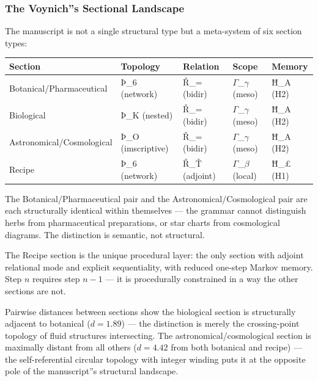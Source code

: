 \documentclass[12pt,a4paper]{article}
\begin{document}
\subsubsection{The Voynich''s Sectional Landscape}

The manuscript is not a single structural type but a meta-system of six section types:

\begin{table}[htbp]
\centering
\small
{}
\begin{tabularx}{\textwidth}{>{\centering\arraybackslash}X >{\centering\arraybackslash}X >{\centering\arraybackslash}X >{\centering\arraybackslash}X >{\centering\arraybackslash}X}
\toprule
\rowcolor{gray!25}\textbf{Section} & \textbf{Topology} & \textbf{Relation} & \textbf{Scope} & \textbf{Memory} \\
\midrule
\rowcolors{1}{white}{gray!10}
Botanical/Pharmaceutical & Þ\_6 (network) & Ř\_= (bidir) & $\Gamma$\_$\gamma$ (meso) & Ħ\_A (H2) \\
Biological & Þ\_K (nested) & Ř\_= (bidir) & $\Gamma$\_$\gamma$ (meso) & Ħ\_A (H2) \\
Astronomical/Cosmological & Þ\_O (imscriptive) & Ř\_= (bidir) & $\Gamma$\_$\gamma$ (meso) & Ħ\_A (H2) \\
Recipe & Þ\_6 (network) & Ř\_Ť (adjoint) & $\Gamma$\_$\beta$ (local) & Ħ\_£ (H1) \\
\bottomrule
\end{tabularx}
\end{table}

The Botanical/Pharmaceutical pair and the Astronomical/Cosmological pair are each structurally identical within themselves --- the grammar cannot distinguish herbs from pharmaceutical preparations, or star charts from cosmological diagrams. The distinction is semantic, not structural.

The Recipe section is the unique procedural layer: the only section with adjoint relational mode and explicit sequentiality, with reduced one-step Markov memory. Step $n$ requires step $n-1$ --- it is procedurally constrained in a way the other sections are not.

Pairwise distances between sections show the biological section is structurally adjacent to botanical ($d = 1.89$) --- the distinction is merely the crossing-point topology of fluid structures intersecting. The astronomical/cosmological section is maximally distant from all others ($d = 4.42$ from both botanical and recipe) --- the self-referential circular topology with integer winding puts it at the opposite pole of the manuscript''s structural landscape.
\end{document}
